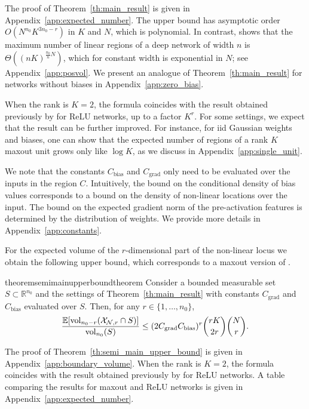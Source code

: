 \documentclass{article}
\theoremstyle{definition}
\newcommand{\cbias}{C_{\text{\normalfont bias}}}
\newcommand{\cgrad}{C_{\text{\normalfont grad}}}
\newcommand{\net}{\mathcal{N}}
\newcommand{\nin}{n_0}
\newcommand{\vol}{\operatorname{vol}}
\begin{document}
The proof of Theorem~\ref{th:main_result} is given in Appendix~\ref{app:expected_number}. 
The upper bound has asymptotic order $O(N^{\nin} K^{3\nin- r})$ in $K$ and $N$, which is polynomial.
In contrast, \citet{sharp2021} shows that the maximum number of linear regions of a deep network of width $n$ is $\Theta((nK)^{\frac{n_0}{n} N})$, which for constant width is exponential in $N$; see Appendix~\ref{app:posvol}. 
%
We present an analogue of Theorem~\ref{th:main_result} for networks without biases in Appendix~\ref{app:zero_bias}. 

When the rank is $K=2$, the formula coincides with the result obtained previously by \citet[Theorem~10]{NIPS2019_8328} for ReLU networks, up to a factor $K^r$. 
For some settings, we expect that the result can be further improved. For instance, for iid Gaussian weights and biases, one can show that the expected number of regions of a rank $K$ maxout unit grows only like $\log K$, as we discuss in Appendix~\ref{app:single_unit}. 

We note that the constants $C_{\text{bias}}$ and $C_{\text{grad}}$ only need to be evaluated over the inputs in the region $C$. 
Intuitively, the bound on the conditional density of bias values corresponds to a bound on the density of non-linear locations over the input.
The bound on the expected gradient norm of the pre-activation features is determined by the distribution of weights. 
We provide more details in Appendix~\ref{app:constants}.

For the expected volume of the $r$-dimensional part of the non-linear locus we obtain the following upper bound, which corresponds to a maxout version of  \citep[Corollary~7]{pmlr-v97-hanin19a}. 
    
\begin{restatable}{theorem}{semimainupperboundtheorem}
        \label{th:semi_main_upper_bound} 
    Consider a bounded measurable set $S \subset \mathbb{R}^{\nin}$ and the settings of Theorem~\ref{th:main_result} with constants $C_{\text{grad}}$ and $C_{\text{bias}}$ evaluated over $S$. Then, for any $r \in \{1, \ldots, \nin\}$,
    \begin{align*}
        \frac{\mathbb{E}[\vol_{\nin - r}(\mathcal{X}_{\net, r} \cap S)]}{\vol_{\nin}(S)} \leq   (2 \cgrad \cbias)^r \binom{rK}{2r} \binom{N}{r}. 
    \end{align*}
\end{restatable}
The proof of Theorem~\ref{th:semi_main_upper_bound} is given in Appendix~\ref{app:boundary_volume}.
When the rank is $K=2$, the formula coincides with the result obtained previously by \citet[Corollary~7]{pmlr-v97-hanin19a} for ReLU networks.
A table comparing the results for maxout and ReLU networks is given in Appendix~\ref{app:expected_number}.
\end{document}
